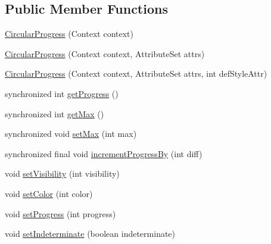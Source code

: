 \subsection*{Public Member Functions}
\begin{DoxyCompactItemize}
\item 
\hyperlink{classcom_1_1material_1_1widget_1_1_circular_progress_aaa170773108fc1723c2d51e2c032b362}{Circular\+Progress} (Context context)
\item 
\hyperlink{classcom_1_1material_1_1widget_1_1_circular_progress_a432f57dfa3fa15ab1b105c1c312355ee}{Circular\+Progress} (Context context, Attribute\+Set attrs)
\item 
\hyperlink{classcom_1_1material_1_1widget_1_1_circular_progress_af0698285a656f82b18471d4af6790e16}{Circular\+Progress} (Context context, Attribute\+Set attrs, int def\+Style\+Attr)
\item 
synchronized int \hyperlink{classcom_1_1material_1_1widget_1_1_circular_progress_a1577acec1ff4d9f114a7d6ee60c87b24}{get\+Progress} ()
\item 
synchronized int \hyperlink{classcom_1_1material_1_1widget_1_1_circular_progress_aa6cfbea7e95e978e1e944b5c1a6b20f5}{get\+Max} ()
\item 
synchronized void \hyperlink{classcom_1_1material_1_1widget_1_1_circular_progress_a3bc35cabfa438ce3c443f3639b3e96e4}{set\+Max} (int max)
\item 
synchronized final void \hyperlink{classcom_1_1material_1_1widget_1_1_circular_progress_a81d1064792c519e3fecb5a77dfdc8114}{increment\+Progress\+By} (int diff)
\item 
void \hyperlink{classcom_1_1material_1_1widget_1_1_circular_progress_adb672c2fd77cb107495e1bbbdc725aea}{set\+Visibility} (int visibility)
\item 
void \hyperlink{classcom_1_1material_1_1widget_1_1_circular_progress_a0b1ec74815fd38eebcc3860e738bd4d1}{set\+Color} (int color)
\item 
void \hyperlink{classcom_1_1material_1_1widget_1_1_circular_progress_a1227d7a44ec3359d6c886155c5c0e234}{set\+Progress} (int progress)
\item 
void \hyperlink{classcom_1_1material_1_1widget_1_1_circular_progress_af67fb106310353ba4847ad2954453478}{set\+Indeterminate} (boolean indeterminate)
\end{DoxyCompactItemize}
